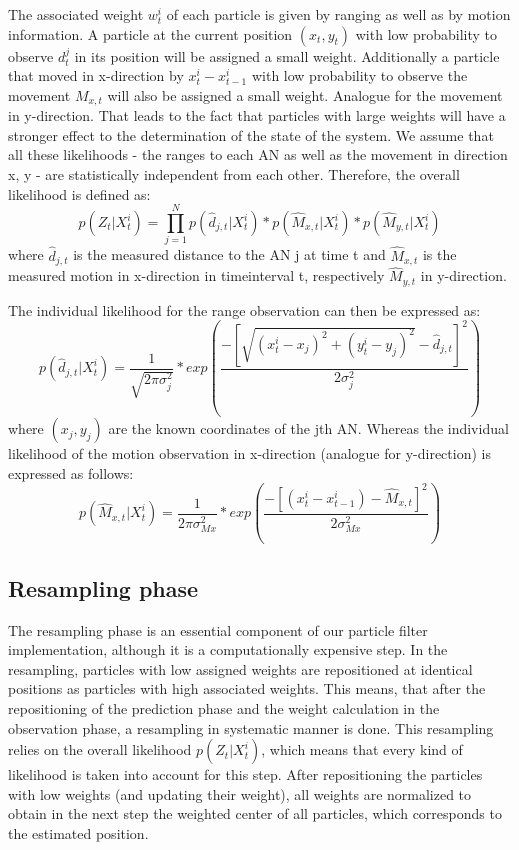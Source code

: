 The associated weight $w^{i}_{t}$ of each particle is given by ranging as well as by motion information. A particle at the current position $(x_{t},y_{t})$ with low probability to observe $d_{t}^{j}$ in its position will be assigned a small weight. Additionally a particle that moved in x-direction by $x_{t}^{i}-x_{t-1}^{i}$ with low probability to observe the movement $M_{x,t}$ will also be assigned a small weight. Analogue for the movement in y-direction.
That leads to the fact that particles with large weights will have a stronger effect to the determination of the state of the system.
We assume that all these likelihoods - the ranges to each AN as well as the movement in direction x, y - are statistically independent from each other. Therefore, the overall likelihood is defined as:
$$p(Z_{t} | X^{i}_{t}) = \prod_{j=1}^{N} p(\hat{d}_{j,t}|X_{t}^{i}) * p(\hat{M}_{x,t} | X^{i}_{t}) * p(\hat{M}_{y,t} | X^{i}_{t})$$
where $\hat{d}_{j,t}$ is the measured distance to the AN j at time t and $\hat{M}_{x,t}$ is the measured motion in x-direction in timeinterval t, respectively $\hat{M}_{y,t}$ in y-direction.  

The individual likelihood for the range observation can then be expressed as:
$$p(\hat{d}_{j,t} | X^{i}_{t}) = \frac{1}{\sqrt{2\pi \sigma_{j}^{2}}} * exp(\frac{-[\sqrt{(x^{i}_{t}-x_{j})^{2}+(y^{i}_{t}-y_{j})^{2}} - \hat{d}_{j,t}]^{2}}{2\sigma_{j}^{2}})$$
where $(x_{j},y_{j})$ are the known coordinates of the jth AN.
Whereas the individual likelihood of the motion observation in x-direction (analogue for y-direction) is expressed as follows:
$$p(\hat{M}_{x,t} | X^{i}_{t}) = \frac{1}{2\pi \sigma_{Mx}^{2}} * exp(\frac{-[(x^{i}_{t}-x^{i}_{t-1}) - \hat{M}_{x,t}]^{2}}{2\sigma_{Mx}^{2}})$$

\subsection{Resampling phase}
The resampling phase is an essential component of our particle filter implementation, although it is a computationally expensive step. In the resampling, particles with low assigned weights are repositioned at identical positions as particles with high associated weights. This means, that after the repositioning of the prediction phase and the weight calculation in the observation phase, a resampling in systematic manner is done. This resampling relies on the overall likelihood $p(Z_{t} | X^{i}_{t})$, which means that every kind of likelihood is taken into account for this step. After repositioning the particles with low weights (and updating their weight), all weights are normalized to obtain in the next step the weighted center of all particles, which corresponds to the estimated position. 
